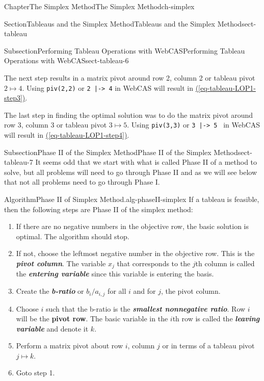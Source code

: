\documentclass[oneside,10pt,]{book}
\newcommand{\xreffont}{\relax}
\newcommand{\mono}[1]{\texttt{#1}}
\newcommand{\alert}[1]{\textbf{\textit{#1}}}
\newcommand{\terminology}[1]{\textbf{#1}}
\numberwithin{equation}{section}
\begin{document}
\begin{chapterptx}{Chapter}{The Simplex Method}{}{The Simplex Method}{}{}{ch-simplex}
\begin{sectionptx}{Section}{Tableaus and the Simplex Method}{}{Tableaus and the Simplex Method}{}{}{sect-tableau}
\begin{subsectionptx}{Subsection}{Performing Tableau Operations with WebCAS}{}{Performing Tableau Operations with WebCAS}{}{}{sect-tableau-6}
\par
The next step results in a matrix pivot around row 2, column 2 or tableau pivot \(2 \mapsto 4\). Using \mono{piv(2,2)} or \mono{2 |-> 4} in WebCAS will result in \hyperref[eq-tableau-LOP1-step3]{({\xreffont\ref{eq-tableau-LOP1-step3}})}.%
\par
The last step in finding the optimal solution was to do the matrix pivot around row 3, column 3 or tableau pivot \(3 \mapsto 5\). Using \mono{piv(3,3)} or \mono{3 |-> 5 } in WebCAS will result in \hyperref[eq-tableau-LOP1-step4]{({\xreffont\ref{eq-tableau-LOP1-step4}})}.%
\end{subsectionptx}
%
%
\typeout{************************************************}
\typeout{************************************************}
%
\begin{subsectionptx}{Subsection}{Phase II of the Simplex Method}{}{Phase II of the Simplex Method}{}{}{sect-tableau-7}
It seems odd that we start with what is called Phase II of a method to solve, but all problems will need to go through Phase II and as we will see below that not all problems need to go through Phase I.%
\begin{algorithm}{Algorithm}{Phase II of Simplex Method.}{}{alg-phaseII-simplex}%
If a tableau is feasible, then the following steps are Phase II of the simplex method:%
\par
%
\begin{enumerate}
\item{}If there are no negative numbers in the objective row, the basic solution is optimal. The algorithm should stop.%
\item{}If not, choose the leftmost negative number in the objective row. This is the \alert{pivot column}. The variable \(x_{j}\) that corresponds to the \(j\)th column is called the \alert{entering variable} since this variable is entering the basis.%
\item{}Create the \alert{b-ratio} or \(b_{i}/a_{i,j}\) for all \(i\) and for \(j\), the pivot column.%
\item{}Choose \(i\) such that the b-ratio is the \alert{smallest nonnegative ratio}. Row \(i\) will be the \terminology{pivot row}. The basic variable in the \(i\)th row is called the \alert{leaving variable} and denote it \(k\).%
\item{}Perform a matrix pivot about row \(i\), column \(j\) or in terms of a tableau pivot \(j \mapsto k\).%
\item{}Goto step 1.%

\end{enumerate}
\end{algorithm}
\end{subsectionptx}
\end{sectionptx}
\end{chapterptx}
\end{document}
